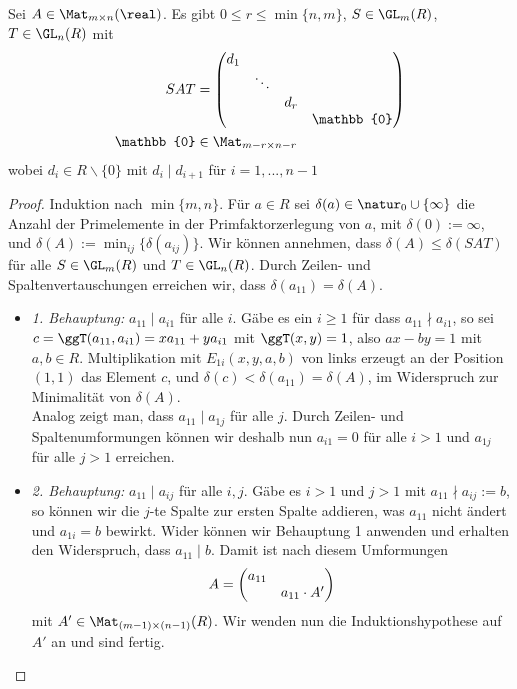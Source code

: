 \begin{theorem}
	Sei $A\in\Mat_{m\times n}(\real)$. Es gibt $0\le r \le\min\{n,m\}$, $S\in\GL_m(R)$, $T\in\GL_n(R)$
	mit 
	\begin{align}
		SAT &= \begin{pmatrix}d_1 & & & \\ & \ddots & & \\ & & d_r & \\ & & & \mathbb{0}\end{pmatrix} \notag \\
		\mathbb{0} &\in\Mat_{m-r\times n-r}\notag
	\end{align}
	wobei $d_i\in R\backslash\{0\}$ mit $d_i\mid d_{i+1}$ für $i=1,...,n-1$
\end{theorem}
\begin{proof}
	Induktion nach $\min\{m,n\}$. Für $a\in R$ sei $\delta(a)\in\natur_0\cup\{\infty\}$ die Anzahl der Primelemente in der Primfaktorzerlegung von $a$, mit $\delta(0):=\infty$, und $\delta(A):=\min_{ij}\{\delta(a_{ij})\}$. Wir können annehmen, dass $\delta(A)\le \delta(SAT)$ für alle $S\in \GL_m(R)$ und $T\in \GL_n(R)$. Durch Zeilen- und Spaltenvertauschungen erreichen wir, dass $\delta(a_{11})=\delta(A)$.
	\begin{itemize}
		\item \emph{1. Behauptung:} $a_{11}\mid a_{i1}$ für alle $i$. Gäbe es ein $i\ge 1$ für dass $a_{11}\nmid a_{i1}$, so sei $c=\ggT(a_{11},a_{i1})=xa_{11}+ya_{i1}$ mit $\ggT(x,y)=1$, also $ax-by=1$ mit $a,b\in R$. Multiplikation mit $E_{1i}(x,y,a,b)$ von links erzeugt an der Position $(1,1)$ das Element $c$, und $\delta(c)<\delta(a_{11})=\delta(A)$, im Widerspruch zur Minimalität von $\delta(A)$. \\
		Analog zeigt man, dass $a_{11}\mid a_{1j}$ für alle $j$. Durch Zeilen- und Spaltenumformungen können wir deshalb nun $a_{i1}=0$ für alle $i>1$ und $a_{1j}$ für alle $j>1$ erreichen.
		\item\emph{2. Behauptung:} $a_{11}\mid a_{ij}$ für alle $i,j$. Gäbe es $i>1$ und $j>1$ mit $a_{11}\nmid a_{ij}:=b$, so können wir die $j$-te Spalte zur ersten Spalte addieren, was $a_{11}$ nicht ändert und $a_{1i}=b$ bewirkt. Wider können wir Behauptung 1 anwenden und erhalten den Widerspruch, dass $a_{11}\mid b$. Damit ist nach diesem Umformungen
		\begin{align}
			A=\begin{pmatrix}a_{11} & \\ & a_{11}\cdot A'\end{pmatrix}\notag
		\end{align}
		mit $A'\in\Mat_{(m-1)\times (n-1)}(R)$. Wir wenden nun die Induktionshypothese auf $A'$ an und sind fertig.
	\end{itemize}
\end{proof}

